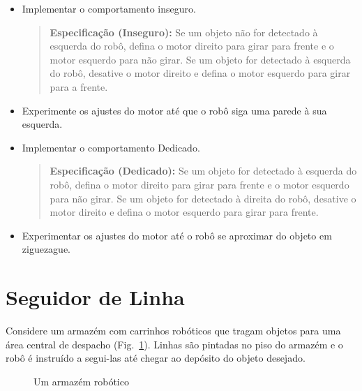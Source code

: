 \begin{framed}
\begin{itemize}
\item Implementar o comportamento inseguro.
\begin{quote}
\normalsize\noindent\textbf{Especificação (Inseguro):} Se um objeto não for detectado à esquerda do robô, defina o motor direito para girar para frente e o motor esquerdo para não girar. Se um objeto for detectado à esquerda do robô, desative o motor direito e defina o motor esquerdo para girar para a frente.
\end{quote}
\item Experimente os ajustes do motor até que o robô siga uma parede à sua esquerda.
\end{itemize}
\end{framed}

\begin{framed}
\begin{itemize}
\item Implementar o comportamento Dedicado.
\begin{quote}
\normalsize\noindent\textbf{Especificação (Dedicado):} Se um objeto for detectado à esquerda do robô, defina o motor direito para girar para frente e o motor esquerdo para não girar. Se um objeto for detectado à direita do robô, desative o motor direito e defina o motor esquerdo para girar para frente.
\end{quote}
\item Experimentar os ajustes do motor até o robô se aproximar do objeto em ziguezague.
\end{itemize}
\end{framed}

\section{Seguidor de Linha}\label{s.line}

Considere um armazém com carrinhos robóticos que tragam objetos para uma área central de despacho (Fig.~\ref{fig.warehouse}). Linhas são pintadas no piso do armazém e o robô é instruído a segui-las até chegar ao depósito do objeto desejado.

\begin{figure}
\begin{center}
\caption{Um armazém robótico}\label{fig.warehouse}
\end{center}
\end{figure}


